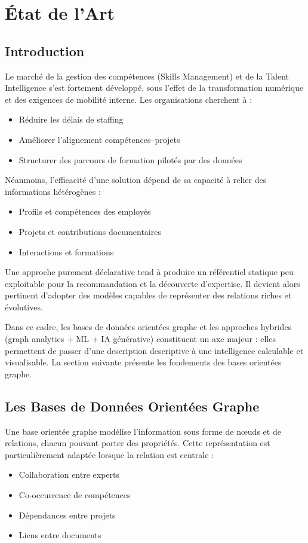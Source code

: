 \documentclass[12pt,a4paper]{report}
\begin{document}
\chapter{État de l'Art}

\section{Introduction}
Le marché de la gestion des compétences (Skills Management) et de la Talent Intelligence s'est fortement développé, sous l'effet de la transformation numérique et des exigences de mobilité interne. Les organisations cherchent à :
\begin{itemize}
  \item Réduire les délais de staffing
  \item Améliorer l'alignement compétences--projets
  \item Structurer des parcours de formation pilotés par des données
\end{itemize}

Néanmoins, l'efficacité d'une solution dépend de sa capacité à relier des informations hétérogènes :
\begin{itemize}
  \item Profils et compétences des employés
  \item Projets et contributions documentaires
  \item Interactions et formations
\end{itemize}

Une approche purement déclarative tend à produire un référentiel statique peu exploitable pour la recommandation et la découverte d'expertise. Il devient alors pertinent d'adopter des modèles capables de représenter des relations riches et évolutives.

Dans ce cadre, les bases de données orientées graphe et les approches hybrides (graph analytics + ML + IA générative) constituent un axe majeur : elles permettent de passer d'une description descriptive à une intelligence calculable et visualisable. La section suivante présente les fondements des bases orientées graphe.

\section{Les Bases de Données Orientées Graphe}
Une base orientée graphe modélise l'information sous forme de nœuds et de relations, chacun pouvant porter des propriétés. Cette représentation est particulièrement adaptée lorsque la relation est centrale :
\begin{itemize}
  \item Collaboration entre experts
  \item Co-occurrence de compétences
  \item Dépendances entre projets
  \item Liens entre documents
\end{itemize}
\end{document}
